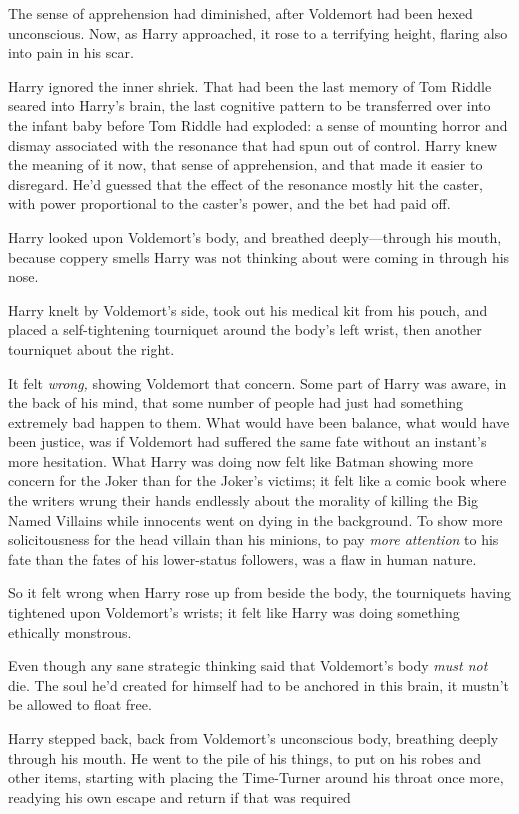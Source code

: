 The sense of apprehension had diminished, after Voldemort had been hexed
unconscious. Now, as Harry approached, it rose to a terrifying height, flaring
also into pain in his scar.

Harry ignored the inner shriek. That had been the last memory of Tom Riddle
seared into Harry's brain, the last cognitive pattern to be transferred over
into the infant baby before Tom Riddle had exploded: a sense of mounting horror
and dismay associated with the resonance that had spun out of control. Harry
knew the meaning of it now, that sense of apprehension, and that made it easier
to disregard. He'd guessed that the effect of the resonance mostly hit the
caster, with power proportional to the caster's power, and the bet had paid off.

Harry looked upon Voldemort's body, and breathed deeply—through his mouth,
because coppery smells Harry was not thinking about were coming in through his
nose.

Harry knelt by Voldemort's side, took out his medical kit from his pouch, and
placed a self-tightening tourniquet around the body's left wrist, then another
tourniquet about the right.

It felt \emph{wrong,} showing Voldemort that concern. Some part of Harry was
aware, in the back of his mind, that some number of people had just had
something extremely bad happen to them. What would have been balance, what
would have been justice, was if Voldemort had suffered the same fate without an
instant's more hesitation. What Harry was doing now felt like Batman showing
more concern for the Joker than for the Joker's victims; it felt like a comic
book where the writers wrung their hands endlessly about the morality of
killing the Big Named Villains while innocents went on dying in the background.
To show more solicitousness for the head villain than his minions, to pay
\emph{more attention} to his fate than the fates of his lower-status followers,
was a flaw in human nature.

So it felt wrong when Harry rose up from beside the body, the tourniquets
having tightened upon Voldemort's wrists; it felt like Harry was doing
something ethically monstrous.

Even though any sane strategic thinking said that Voldemort's body \emph{must
not} die. The soul he'd created for himself had to be anchored in this brain,
it mustn't be allowed to float free.

Harry stepped back, back from Voldemort's unconscious body, breathing deeply
through his mouth. He went to the pile of his things, to put on his robes and
other items, starting with placing the Time-Turner around his throat once more,
readying his own escape and return if that was required{\el}


